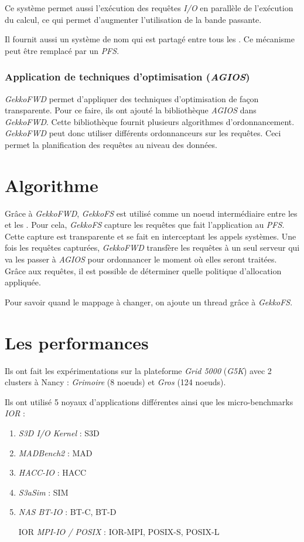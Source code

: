 \documentclass[10pt, a4paper]{article}
\begin{document}
Ce système permet aussi l'exécution des requêtes \emph{I/O} en parallèle de l'exécution du calcul, ce qui permet d'augmenter l'utilisation de la bande passante.

Il fournit aussi un système de nom qui est partagé entre tous les \noeudsDeCalculs{}. Ce mécanisme peut être remplacé par un \emph{PFS}.

\subsubsection{Application de techniques d'optimisation (\emph{AGIOS})}

\emph{GekkoFWD} permet d'appliquer des techniques d'optimisation de façon transparente. Pour ce faire, ils ont ajouté la bibliothèque \emph{AGIOS} dans \emph{GekkoFWD}. Cette bibliothèque fournit plusieurs algorithmes d'ordonnancement.
\emph{GekkoFWD} peut donc utiliser différents ordonnanceurs sur les requêtes. Ceci permet la planification des requêtes au niveau des données.

\section{Algorithme}

Grâce à \emph{GekkoFWD}, \emph{GekkoFS} est utilisé comme un noeud intermédiaire entre les \noeudsDeCalculs{} et les \noeudsIO{}. Pour cela, \emph{GekkoFS} capture les requêtes que fait l'application au \emph{PFS}. Cette capture est transparente et se fait en interceptant les appels systèmes. Une fois les requêtes capturées, \emph{GekkoFWD} transfère les requêtes à un seul serveur qui va les passer à \emph{AGIOS} pour ordonnancer le moment où elles seront traitées. Grâce aux requêtes, il est possible de déterminer quelle politique d'allocation appliquée.

Pour savoir quand le mappage à changer, on ajoute un thread grâce à \emph{GekkoFS}.

\section{Les performances}

Ils ont fait les expérimentations sur la plateforme \emph{Grid 5000} (\emph{G5K}) avec 2 clusters à Nancy : \emph{Grimoire} (8 noeuds) et \emph{Gros} (124 noeuds).

Ils ont utilisé 5 noyaux d'applications différentes ainsi que les micro-benchmarks \emph{IOR} :
\begin{enumerate}
  \item \emph{S3D I/O Kernel} : S3D
  \item \emph{MADBench2} : MAD
  \item \emph{HACC-IO} : HACC
  \item \emph{S3aSim} : SIM
  \item \emph{NAS BT-IO} : BT-C, BT-D
  \item [IOR] \emph{MPI-IO / POSIX} : IOR-MPI, POSIX-S, POSIX-L
\end{enumerate}
\end{document}
